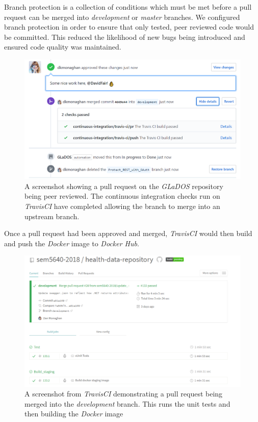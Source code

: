 \par
Branch protection is a collection of conditions which must be met before a pull request can be merged into \textit{development} or \textit{master} branches. We configured branch protection in order to ensure that only tested, peer reviewed code would be committed. This reduced the likelihood of new bugs being introduced and ensured code quality was maintained.

\begin{figure}[H]
    \centering
    \includegraphics[width=\textwidth]{Images/approve_pr.png}
    \caption{A screenshot showing a pull request on the \textit{GLaDOS} repository being peer reviewed. The continuous integration checks run on \textit{TravisCI} have completed allowing the branch to merge into an upstream branch.}
\end{figure}

Once a pull request had been approved and merged, \textit{TravisCI} would then build and push the \textit{Docker} image to \textit{Docker Hub}.

\begin{figure}[H]
    \centering
    \includegraphics[width=\textwidth]{Images/travis_builds_overview.png}
    \caption{A screenshot from \textit{TravisCI} demonstrating a pull request being merged into the \textit{development} branch. This runs the unit tests and then building the \textit{Docker} image}
\end{figure}


